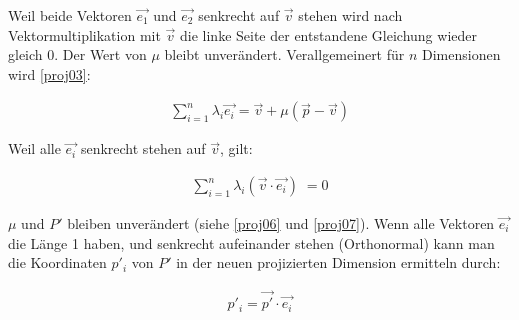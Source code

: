 \documentclass[10pt,a4paper,twoside,titlepage]{article}
\newcommand{\myeq}[2]{
	\begin{equation}
		\begin{split}
			#1
		\end{split}
		\label{#2}
	\end{equation}
}
\begin{document}
Weil beide Vektoren $\vec{e_1}$ und $\vec{e_2}$ senkrecht auf $\vec{v}$ stehen
wird nach Vektormultiplikation mit $\vec{v}$ die linke Seite der entstandene 
Gleichung wieder gleich 0. Der Wert von $\mu$ bleibt unverändert. Verallgemeinert
für $n$ Dimensionen wird \autoref{proj03}:
\myeq{
	\sum_{i=1}^{n}\lambda_i\vec{e_i} = \vec{v} + \mu(\vec{p}-\vec{v})
}{proj09}
Weil alle $\vec{e_i}$ senkrecht stehen auf $\vec{v}$, gilt:
\myeq{
	\sum_{i=1}^{n}\lambda_i (\vec{v}\cdot\vec{e_i})\;=0
}{proj10}
$\mu$ und $P'$ bleiben unverändert (siehe \autoref{proj06} und 
\autoref{proj07}). Wenn alle
Vektoren $\vec{e_i}$ die Länge 1 haben, und senkrecht aufeinander stehen
(Orthonormal) kann man die Koordinaten $p'_i$ von $P'$ in der neuen 
projizierten Dimension ermitteln durch:
\myeq{
	p'_i = \vec{p'}\cdot\vec{e_i}
}{proj11}
\end{document}
